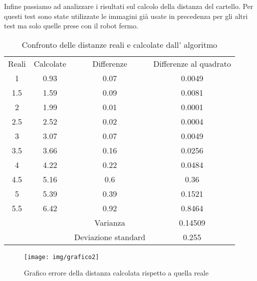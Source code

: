 	Infine passiamo ad analizzare i risultati sul calcolo della distanza del cartello. Per questi test sono state utilizzate le immagini già usate in precedenza per gli altri test ma solo quelle prese con il robot fermo.

	\begin{table}[h]
		\centering
		\begin{tabular}{cccc}
		    Reali & Calcolate & Differenze & Differenze al quadrato \\
			1 	&   0.93	& 0.07		& 0.0049    	\\
			1.5 &   1.59    & 0.09 		& 0.0081 		\\
			2 	& 	1.99	& 0.01		& 0.0001 		\\
			2.5 &   2.52	& 0.02		& 0.0004		\\
			3	&   3.07	& 0.07		& 0.0049		\\
			3.5 &   3.66	& 0.16		& 0.0256		\\
			4 	&   4.22	& 0.22		& 0.0484		\\
			4.5 &   5.16	& 0.6		& 0.36			\\
			5 	&   5.39	& 0.39		& 0.1521		\\
			5.5 &   6.42	& 0.92		& 0.8464		\\
			\hline
			& & Varianza & 0.14509 \\
			& & Deviazione standard & 0.255 \\

		\end{tabular}
		\caption{Confronto delle distanze reali e calcolate dall' algoritmo}
	\end{table}

	\begin{figure}[!ht]
		\centering
		\texttt{[image: img/grafico2]}
		\caption{Grafico errore della distanza calcolata rispetto a quella reale }
	\end{figure}

